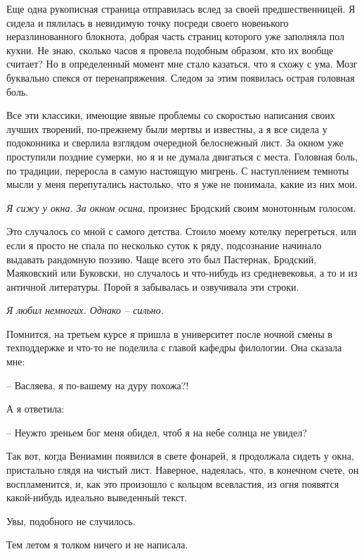 \documentclass[
]{book}
\begin{document}
Еще одна рукописная страница отправилась вслед за своей предшественницей. Я сидела и пялилась в невидимую точку посреди своего новенького неразлинованного блокнота, добрая часть страниц которого уже заполняла пол кухни. Не знаю, сколько часов я провела подобным образом, кто их вообще считает? Но в определенный момент мне стало казаться, что я схожу с ума. Мозг буквально спекся от перенапряжения. Следом за этим появилась острая головная боль.

Все эти классики, имеющие явные проблемы со скоростью написания своих лучших творений, по-прежнему были мертвы и известны, а я все сидела у подоконника и сверлила взглядом очередной белоснежный лист. За окном уже проступили поздние сумерки, но я и не думала двигаться с места. Головная боль, по традиции, переросла в самую настоящую мигрень. С наступлением темноты мысли у меня перепутались настолько, что я уже не понимала, какие из них мои.

\emph{Я сижу у окна. За окном осина}, произнес Бродский своим монотонным голосом.

Это случалось со мной с самого детства. Стоило моему котелку перегреться, или если я просто не спала по несколько суток к ряду, подсознание начинало выдавать рандомную поэзию. Чаще всего это был Пастернак, Бродский, Маяковский или Буковски, но случалось и что-нибудь из средневековья, а то и из античной литературы. Порой я забывалась и озвучивала эти строки.

\emph{Я любил немногих. Однако -- сильно.}

Помнится, на третьем курсе я пришла в университет после ночной смены в техподдержке и что-то не поделила с главой кафедры филологии. Она сказала мне:

-- Васляева, я по-вашему на дуру похожа?!

А я ответила:

-- Неужто зреньем бог меня обидел, чтоб я на небе солнца не увидел?

Так вот, когда Вениамин появился в свете фонарей, я продолжала сидеть у окна, пристально глядя на чистый лист. Наверное, надеялась, что, в конечном счете, он воспламенится, и, как это произошло с кольцом всевластия, из огня появятся какой-нибудь идеально выведенный текст.

Увы, подобного не случилось.

Тем летом я толком ничего и не написала.

\hypertarget{chapter-49}{%
\chapter{~}\label{chapter-49}}
\end{document}
